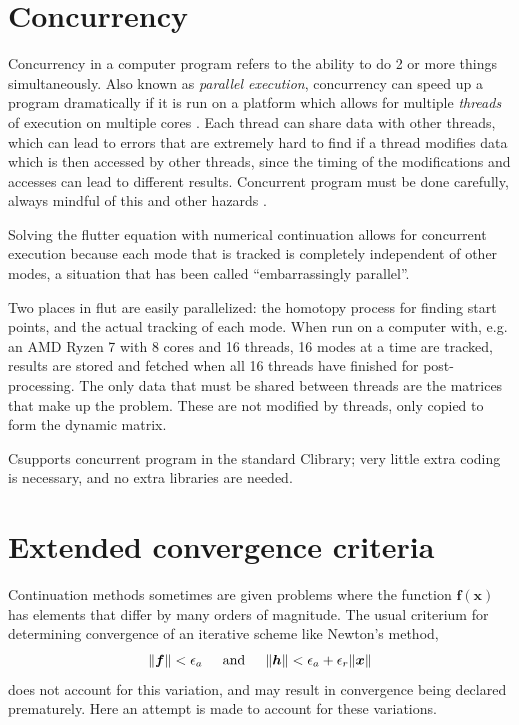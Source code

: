 \documentclass[11pt,openany,twoside]{book}
\numberwithin{equation}{section}		%
\def\Cpp{{C\nolinebreak[4]\hspace{-.05em}\raisebox{.4ex}{\tiny\bf ++}}\:}
\newcommand{\Cmd}[1]{{\sf #1}}
\newcommand{\Newterm}[1]{{\em #1}}	%
\newcommand{\Vector}[1]{\boldsymbol{#1}}
\begin{document}
\section{Concurrency}\label{sect:concurrency}
Concurrency in a computer program refers to the ability to do 2 or
more things simultaneously. Also known as \Newterm{parallel execution},
concurrency can speed up a program dramatically if it is run on a platform
which allows for multiple \Newterm{threads} of execution on multiple cores
\cite{williams2009c++}.
Each thread can share data with other threads, which can lead to errors that
are extremely hard to find if a thread modifies data which is then accessed by
other threads, since the timing of the modifications and accesses can lead
to different results. Concurrent program must be done carefully, always mindful
of this and other hazards
\cite{williams2009c++}.
\par
Solving the flutter equation with numerical continuation allows for
concurrent execution because each mode that is tracked is completely
independent of other modes, a situation that has been called
``embarrassingly parallel''.
\par
Two places in \Cmd{flut} are easily parallelized: the homotopy process for
finding start points, and the actual tracking of each mode. When run on a
computer with, e.g. an AMD Ryzen 7 with 8 cores and 16 threads, 16 modes
at a time are tracked, results are stored and fetched when all 16 threads have
finished for post-processing.
The only data that must be shared between threads are the matrices that
make up the problem. These are not modified by threads, only copied to form
the dynamic matrix.
\par
\Cpp supports concurrent program in the standard \Cpp library; very little extra
coding is necessary, and no extra libraries are needed.

\section{Extended convergence criteria}\label{sect:ecc}
Continuation methods sometimes are given problems where the function
$\Vector{f(x)}$
has elements that differ by many orders of magnitude. The usual criterium
for determining convergence of an iterative scheme like Newton's method,
\begin{equation}
\label{eqn:tradcc}
\| \Vector{f} \| < \epsilon_{a} \hspace{0.2in} \text{and} \hspace{0.2in} \| \Vector{h} \| < \epsilon_{a} + \epsilon_{r}\| \Vector{x} \|
\end{equation}
does not account for this variation, and may result in convergence being
declared prematurely. Here an attempt is made to account for these variations.
\end{document}
